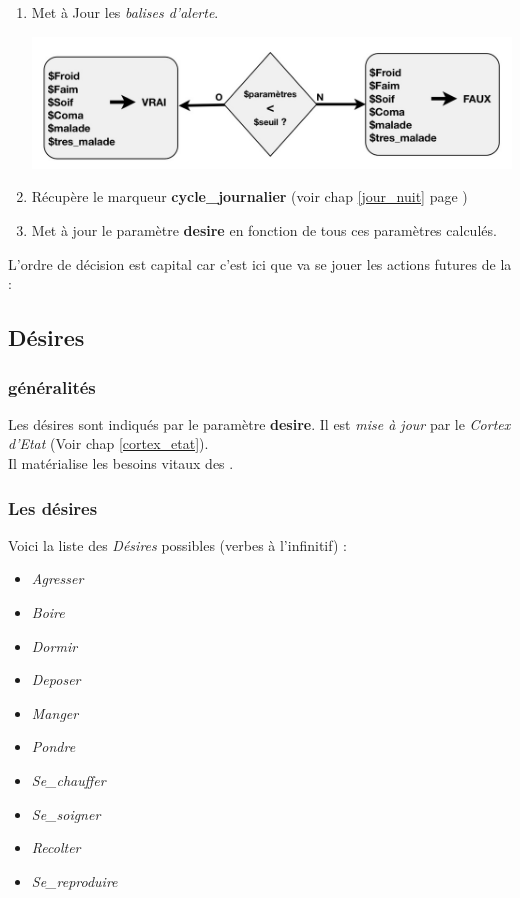\documentclass[french]{report}
\begin{document}
\begin{enumerate}
	\item Met à Jour les \textit{balises d'alerte}.
	\begin{center}
		\includegraphics[width=1\linewidth]{images/cortex05}
	\end{center}

	\item Récupère le marqueur \textbf{cycle\_journalier} (voir chap \ref{jour_nuit} page \pageref{jour_nuit})\\
	
	\item Met à jour le paramètre \textbf{desire} en fonction de tous ces paramètres calculés.\\

\end{enumerate}
L'ordre de décision est capital car c'est ici que va se jouer les actions futures de la \CoCiX : \\

\subsection{Désires}\label{desire}
\subsubsection{généralités}
Les désires sont indiqués par le paramètre \textbf{desire}. Il est \textit{mise à jour} par le \textit{Cortex d'Etat} (Voir chap \ref{cortex_etat}).\\
Il matérialise les besoins vitaux des \CoCiX.\\

\subsubsection{Les désires}
Voici la liste des \textit{Désires} possibles (verbes à l'infinitif) : \\
\begin{itemize}
	\item \textit{Agresser}
	\item \textit{Boire}
	\item \textit{Dormir}
	\item \textit{Deposer}
	\item \textit{Manger}
	\item \textit{Pondre}
	\item \textit{Se\_chauffer}
	\item \textit{Se\_soigner}
	\item \textit{Recolter}
	\item \textit{Se\_reproduire}\\
\end{itemize}
\end{document}
